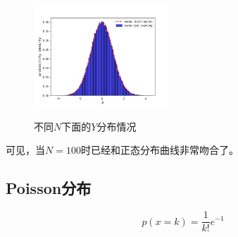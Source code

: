 \documentclass[UTF8]{ctexart}
\begin{document}
\begin{figure}[H]
{						\includegraphics[width=0.45\textwidth]{../result/exp_1000.png}}	
					\caption{不同$N$下面的$Y$分布情况}
					\label{Fig.main}
				\end{figure}
			
	可见，当$N=100$时已经和正态分布曲线非常吻合了。
	\newpage
	\subsection{Poisson分布}
	$$p(x=k)=\frac{1}{k!}e^{-1}$$
\end{document}
